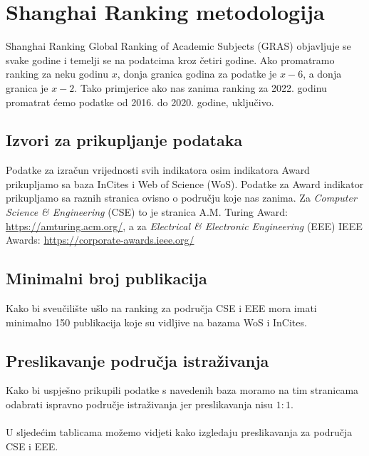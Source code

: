 \documentclass[times, utf8, zavrsni]{fer}
\begin{document}
\chapter{Shanghai Ranking metodologija}
Shanghai Ranking Global Ranking of Academic Subjects (GRAS) objavljuje se svake godine i temelji se na podatcima kroz četiri godine.
Ako  promatramo ranking za neku godinu $x$,
donja granica godina za podatke je $x-6$, a donja granica je $x-2$. Tako primjerice ako nas zanima ranking za 2022. godinu promatrat ćemo podatke od 2016. do 2020. godine, uključivo.

\section{Izvori za prikupljanje podataka}
Podatke za izračun vrijednosti svih indikatora osim indikatora Award prikupljamo sa baza InCites i Web of Science (WoS). 
Podatke za Award indikator prikupljamo sa raznih stranica ovisno o području koje nas zanima.
Za \emph{Computer Science \& Engineering} (CSE) to je stranica A.M. Turing Award: \url{https://amturing.acm.org/}, a za \emph{Electrical \& Electronic Engineering} (EEE) IEEE Awards:
\url{https://corporate-awards.ieee.org/}

\section{Minimalni broj publikacija} Kako bi sveučilište ušlo na ranking za područja CSE i EEE mora imati minimalno 150 publikacija koje su vidljive 
na bazama WoS i InCites.
\\ \section{Preslikavanje područja istraživanja}Kako bi uspješno prikupili podatke s navedenih baza moramo na tim stranicama odabrati ispravno područje istraživanja jer preslikavanja nisu $1:1$.
\\\\U sljedećim tablicama možemo vidjeti kako izgledaju preslikavanja za područja CSE i EEE.
\end{document}
